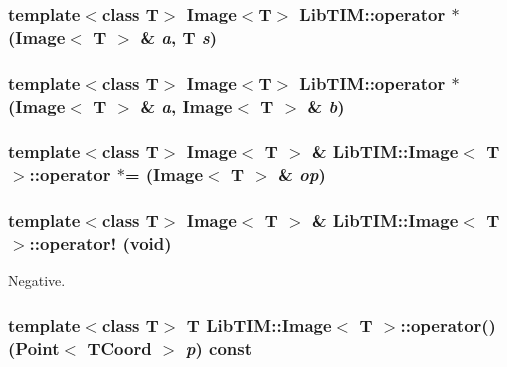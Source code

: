 \subsubsection{\setlength{\rightskip}{0pt plus 5cm}template$<$class T$>$ Image$<$T$>$ Lib\-TIM::operator $\ast$ (Image$<$ T $>$ \& {\em a}, T {\em s})}\label{group__Image_ga76}


\subsubsection{\setlength{\rightskip}{0pt plus 5cm}template$<$class T$>$ Image$<$T$>$ Lib\-TIM::operator $\ast$ (Image$<$ T $>$ \& {\em a}, Image$<$ T $>$ \& {\em b})}\label{group__Image_ga73}


\subsubsection{\setlength{\rightskip}{0pt plus 5cm}template$<$class T$>$ Image$<$ T $>$ \& {\bf Lib\-TIM::Image}$<$ T $>$::operator $\ast$= ({\bf Image}$<$ T $>$ \& {\em op})\hspace{0.3cm}{\tt  [inherited]}}\label{group__Image_ga49}


\subsubsection{\setlength{\rightskip}{0pt plus 5cm}template$<$class T$>$ Image$<$ T $>$ \& {\bf Lib\-TIM::Image}$<$ T $>$::operator! (void)\hspace{0.3cm}{\tt  [inherited]}}\label{group__Image_ga53}


Negative. 

\subsubsection{\setlength{\rightskip}{0pt plus 5cm}template$<$class T$>$ T {\bf Lib\-TIM::Image}$<$ T $>$::operator() ({\bf Point}$<$ {\bf TCoord} $>$ {\em p}) const\hspace{0.3cm}{\tt  [inline, inherited]}}\label{group__Image_ga46}


